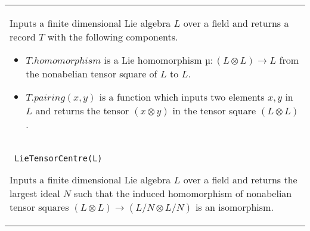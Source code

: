 \documentclass[a4paper,11pt]{report}
\begin{document}
{\begin{center}
\begin{tabular}{|l|}
 Inputs a finite dimensional Lie algebra $L$ over a field and returns a record $T$ with the following components. 
\begin{itemize}
\item  $T.homomorphism$ is a Lie homomorphism $µ : (L \otimes L) \longrightarrow L$ from the nonabelian tensor square of $L$ to $L$. 
\item  $T.pairing(x,y)$ is a function which inputs two elements $x, y$ in $L$ and returns the tensor $(x \otimes y)$ in the tensor square $(L \otimes L)$ . 
\end{itemize}
 \\
 \index{LieTensorCentre} \texttt{ LieTensorCentre(L) } 

 Inputs a finite dimensional Lie algebra $L$ over a field and returns the largest ideal $N$ such that the induced homomorphism of nonabelian tensor squares $(L \otimes L) \longrightarrow (L/N \otimes L/N)$ is an isomorphism. \\
\end{tabular}\\[2mm]
\end{center}

 }

 
\end{document}
